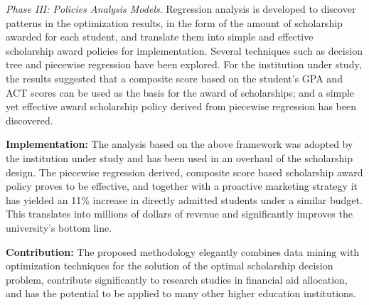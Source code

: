 \documentclass[12pt,english]{report}
\begin{document}
\vspace*{.1in} 
\noindent \textit{Phase III: Policies Analysis Models}. Regression analysis is developed to discover patterns in the optimization results, in the form of the  amount of scholarship awarded for each student, and translate them into simple and effective scholarship award policies for implementation. Several techniques such as decision tree and piecewise regression  have been explored. For the institution under study, the results suggested that  a composite score based on the student's GPA and ACT scores can be used as the basis for the award of scholarships; and a simple  yet effective award scholarship policy derived from piecewise regression has been discovered.

\vspace*{.15in}
\noindent \textbf{Implementation:} The analysis based on the above framework was adopted by the institution under study and has been used in an overhaul of the scholarship design. The piecewise regression derived, composite score based scholarship award policy proves to be effective, and together with a proactive marketing strategy it has yielded an 11\% increase in directly admitted students under a similar budget. This translates into millions of dollars of revenue and significantly improves the university's bottom line.

\vspace*{.15in}
\noindent \textbf{Contribution:} The proposed methodology elegantly combines data mining with optimization techniques for the solution of the optimal scholarship decision problem,  contribute significantly to research studies in financial aid allocation, and has the potential to be applied to many other higher education institutions.



\newpage 

\end{document}
